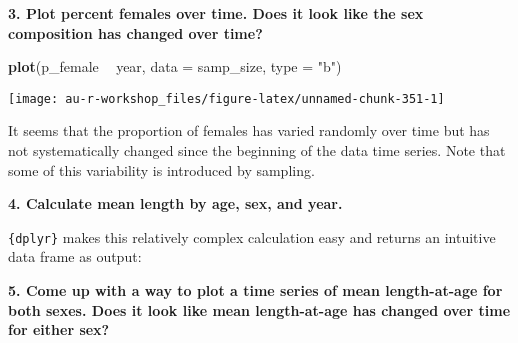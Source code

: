 \documentclass[]{book}
\newenvironment{Shaded}{\begin{snugshade}}{\end{snugshade}}
\newcommand{\KeywordTok}[1]{\textcolor[rgb]{0.13,0.29,0.53}{\textbf{#1}}}
\newcommand{\DataTypeTok}[1]{\textcolor[rgb]{0.13,0.29,0.53}{#1}}
\newcommand{\StringTok}[1]{\textcolor[rgb]{0.31,0.60,0.02}{#1}}
\newcommand{\OperatorTok}[1]{\textcolor[rgb]{0.81,0.36,0.00}{\textbf{#1}}}
\newcommand{\NormalTok}[1]{#1}
\theoremstyle{definition}
\theoremstyle{definition}
\theoremstyle{definition}
\theoremstyle{remark}
\begin{document}
\textbf{3. Plot percent females over time. Does it look like the sex
composition has changed over time?}

\begin{Shaded}
\begin{Highlighting}[]
\KeywordTok{plot}\NormalTok{(p_female }\OperatorTok{~}\StringTok{ }\NormalTok{year, }\DataTypeTok{data =}\NormalTok{ samp_size, }\DataTypeTok{type =} \StringTok{"b"}\NormalTok{)}
\end{Highlighting}
\end{Shaded}

\begin{center}\texttt{[image: au-r-workshop\_files/figure-latex/unnamed-chunk-351-1]} \end{center}

It seems that the proportion of females has varied randomly over time
but has not systematically changed since the beginning of the data time
series. Note that some of this variability is introduced by sampling.

\textbf{4. Calculate mean length by age, sex, and year.}

\texttt{\{dplyr\}} makes this relatively complex calculation easy and
returns an intuitive data frame as output:

\begin{Shaded}
\end{Shaded}

\textbf{5. Come up with a way to plot a time series of mean
length-at-age for both sexes. Does it look like mean length-at-age has
changed over time for either sex?}
\end{document}
